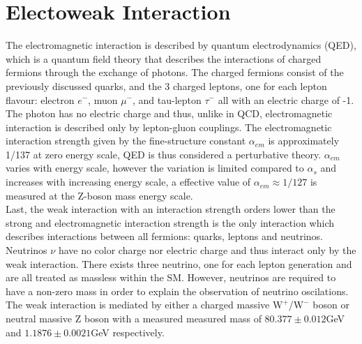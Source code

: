 \section{Electoweak Interaction}

The electromagnetic interaction is described by quantum electrodynamics (QED), which is a quantum field theory that describes the interactions of charged fermions through the exchange of photons. The charged fermions consist of the previously discussed quarks, and the 3 charged leptons, one for each lepton flavour: electron $e^-$, muon $\mu^-$, and tau-lepton $\tau^-$  all with an electric charge of -1. The photon has no electric charge and thus, unlike in QCD, electromagnetic interaction is described only by lepton-gluon couplings. The electromagnetic interaction strength given by the fine-structure constant $\alpha_{em} $ is approximately 1/137 at zero energy scale, QED is thus considered a perturbative theory. $\alpha_{em}$ varies with energy scale, however the variation is limited compared to $\alpha_s$ and increases with increasing energy scale, a effective value of $\alpha_{em} \approx 1/127$ is measured at the Z-boson mass energy scale.\\
Last, the weak interaction with an interaction strength orders lower than the strong and electromagnetic interaction strength is the only interaction which describes interactions between all fermions: quarks, leptons and neutrinos. Neutrinos $\nu$ have no color charge nor electric charge and thus interact only by the weak interaction. There exists three neutrino, one for each lepton generation and are all treated as massless within the SM. However, neutrinos are required to have a non-zero mass in order to explain the observation of neutrino oscilations\cite{de_Salas_2018}. The weak interaction is mediated by either a charged massive $\text{W}^+$/$\text{W}^-$ boson or neutral massive Z boson with a measured measured mass of $80.377 \pm 0.012$GeV and $1.1876 \pm 0.0021$GeV respectively.

